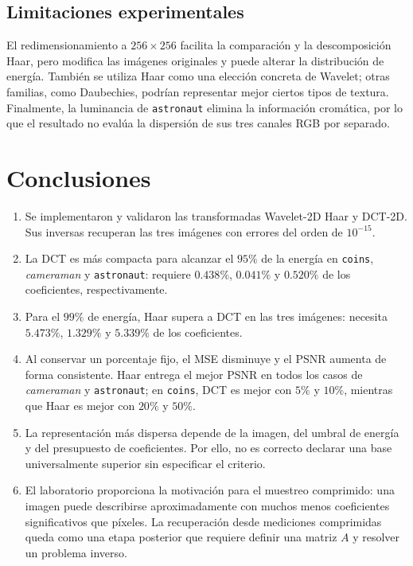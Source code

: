 \documentclass[11pt,a4paper]{article}
\begin{document}
\subsection{Limitaciones experimentales}

El redimensionamiento a $256\times256$ facilita la comparación y la descomposición Haar, pero modifica las imágenes originales y puede alterar la distribución de energía. También se utiliza Haar como una elección concreta de Wavelet; otras familias, como Daubechies, podrían representar mejor ciertos tipos de textura. Finalmente, la luminancia de \texttt{astronaut} elimina la información cromática, por lo que el resultado no evalúa la dispersión de sus tres canales RGB por separado.

\section{Conclusiones}

\begin{enumerate}[label=\arabic*.]
    \item Se implementaron y validaron las transformadas Wavelet-2D Haar y DCT-2D. Sus inversas recuperan las tres imágenes con errores del orden de $10^{-15}$.
    \item La DCT es más compacta para alcanzar el $95\%$ de la energía en \texttt{coins}, \textit{cameraman} y \texttt{astronaut}: requiere $0.438\%$, $0.041\%$ y $0.520\%$ de los coeficientes, respectivamente.
    \item Para el $99\%$ de energía, Haar supera a DCT en las tres imágenes: necesita $5.473\%$, $1.329\%$ y $5.339\%$ de los coeficientes.
    \item Al conservar un porcentaje fijo, el MSE disminuye y el PSNR aumenta de forma consistente. Haar entrega el mejor PSNR en todos los casos de \textit{cameraman} y \texttt{astronaut}; en \texttt{coins}, DCT es mejor con $5\%$ y $10\%$, mientras que Haar es mejor con $20\%$ y $50\%$.
    \item La representación más dispersa depende de la imagen, del umbral de energía y del presupuesto de coeficientes. Por ello, no es correcto declarar una base universalmente superior sin especificar el criterio.
    \item El laboratorio proporciona la motivación para el muestreo comprimido: una imagen puede describirse aproximadamente con muchos menos coeficientes significativos que píxeles. La recuperación desde mediciones comprimidas queda como una etapa posterior que requiere definir una matriz $A$ y resolver un problema inverso.
\end{enumerate}
\end{document}
